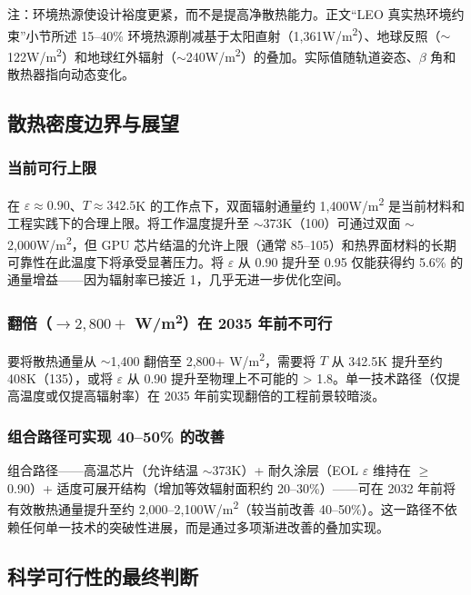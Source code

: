 注：环境热源使设计裕度更紧，而不是提高净散热能力。正文“LEO 真实热环境约束”小节所述 15--40\% 环境热源削减基于太阳直射（1,361\;W/m\textsuperscript{2}）、地球反照（$\sim$122\;W/m\textsuperscript{2}）和地球红外辐射（$\sim$240\;W/m\textsuperscript{2}）的叠加。实际值随轨道姿态、$\beta$ 角和散热器指向动态变化。

\subsection{散热密度边界与展望}

\subsubsection{当前可行上限}

在 $\varepsilon\approx0.90$、$T\approx342.5$\;K 的工作点下，双面辐射通量约 1,400\;W/m\textsuperscript{2} 是当前材料和工程实践下的合理上限。将工作温度提升至 $\sim$373\;K（100\unitC{}）可通过双面 $\sim$2,000\;W/m\textsuperscript{2}，但 GPU 芯片结温的允许上限（通常 85--105\unitC{}）和热界面材料的长期可靠性在此温度下将承受显著压力。将 $\varepsilon$ 从 0.90 提升至 0.95 仅能获得约 5.6\% 的通量增益——因为辐射率已接近 1，几乎无进一步优化空间。

\subsubsection{翻倍（$\to 2,800+$ W/m\textsuperscript{2}）在 2035 年前不可行}

要将散热通量从 $\sim$1,400 翻倍至 2,800+ W/m\textsuperscript{2}，需要将 $T$ 从 342.5\;K 提升至约 408\;K（135\unitC{}），或将 $\varepsilon$ 从 0.90 提升至物理上不可能的 > 1.8。单一技术路径（仅提高温度或仅提高辐射率）在 2035 年前实现翻倍的工程前景较暗淡。

\subsubsection{组合路径可实现 40--50\% 的改善}

组合路径——高温芯片（允许结温 $\sim$373\;K）+ 耐久涂层（EOL $\varepsilon$ 维持在 $\geq$0.90）+ 适度可展开结构（增加等效辐射面积约 20--30\%）——可在 2032 年前将有效散热通量提升至约 2,000--2,100\;W/m\textsuperscript{2}（较当前改善 40--50\%）。这一路径不依赖任何单一技术的突破性进展，而是通过多项渐进改善的叠加实现。

\subsection{科学可行性的最终判断}


